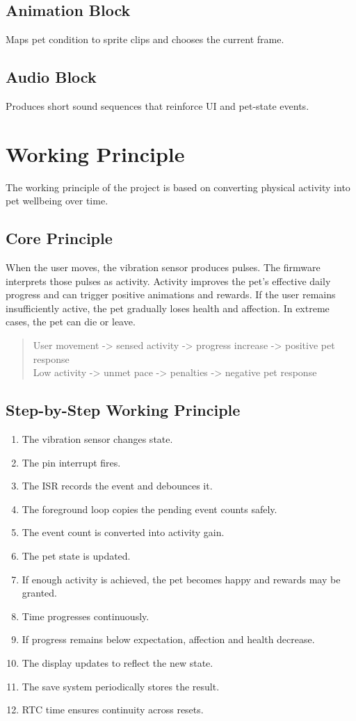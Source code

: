 \documentclass[conference]{IEEEtran}
\begin{document}
\subsection{Animation Block}
Maps pet condition to sprite clips and chooses the current frame.

\subsection{Audio Block}
Produces short sound sequences that reinforce UI and pet-state events.

\section{Working Principle}
The working principle of the project is based on converting physical activity into pet wellbeing over time.

\subsection{Core Principle}
When the user moves, the vibration sensor produces pulses. The firmware interprets those pulses as activity. Activity improves the pet's effective daily progress and can trigger positive animations and rewards. If the user remains insufficiently active, the pet gradually loses health and affection. In extreme cases, the pet can die or leave.

\begin{quote}
\ttfamily
User movement -> sensed activity -> progress increase -> positive pet response\\
Low activity -> unmet pace -> penalties -> negative pet response
\end{quote}

\subsection{Step-by-Step Working Principle}
\begin{enumerate}
\item The vibration sensor changes state.
\item The pin interrupt fires.
\item The ISR records the event and debounces it.
\item The foreground loop copies the pending event counts safely.
\item The event count is converted into activity gain.
\item The pet state is updated.
\item If enough activity is achieved, the pet becomes happy and rewards may be granted.
\item Time progresses continuously.
\item If progress remains below expectation, affection and health decrease.
\item The display updates to reflect the new state.
\item The save system periodically stores the result.
\item RTC time ensures continuity across resets.
\end{enumerate}
\end{document}
